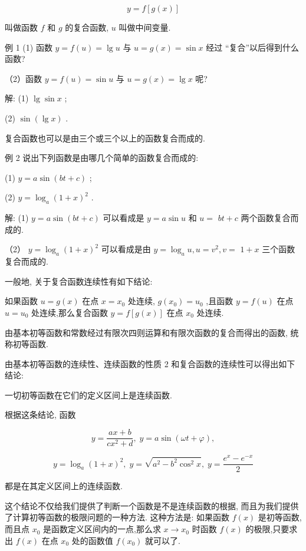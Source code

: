 \documentclass[10pt]{article}
\begin{document}
\[
y = f\left\lbrack {g\left( x\right) }\right\rbrack
\]

叫做函数 \(f\) 和 \(g\) 的复合函数, \(u\) 叫做中间变量.

例 1 (1) 函数 \(y = f\left( u\right) = \lg u\) 与 \(u = g\left( x\right) = \sin x\) 经过 “复合”以后得到什么函数?

（2）函数 \(y = f\left( u\right) = \sin u\) 与 \(u = g\left( x\right) = \lg x\) 呢?

解: (1) \(\lg \sin x\) ;

(2) \(\sin \left( {\lg x}\right)\) .

复合函数也可以是由三个或三个以上的函数复合而成的.

例 2 说出下列函数是由哪几个简单的函数复合而成的:

(1) \(y = a\sin \left( {{bt} + c}\right)\) ;

(2) \(y = {\log }_{a}{\left( 1 + x\right) }^{2}\) .

解: (1) \(y = a\sin \left( {{bt} + c}\right)\) 可以看成是 \(y = a\sin u\) 和 \(u =\) \({bt} + c\) 两个函数复合而成的.

（2） \(y = {\log }_{a}{\left( 1 + x\right) }^{2}\) 可以看成是由 \(y = {\log }_{a}u,u = {v}^{2},v =\) \(1 + x\) 三个函数复合而成的.

一般地, 关于复合函数连续性有如下结论:

如果函数 \(u = g\left( x\right)\) 在点 \(x = {x}_{0}\) 处连续, \(g\left( {x}_{0}\right) = {u}_{0}\) ,且函数 \(y = f\left( u\right)\) 在点 \(u = {u}_{0}\) 处连续,那么复合函数 \(y = f\left\lbrack {g\left( x\right) }\right\rbrack\) 在点 \({x}_{0}\) 处连续.

由基本初等函数和常数经过有限次四则运算和有限次函数的复合而得出的函数, 统称初等函数.

由基本初等函数的连续性、连续函数的性质 2 和复合函数的连续性可以得出如下结论:

一切初等函数在它们的定义区间上是连续函数.

根据这条结论, 函数

\[
y = \frac{{ax} + b}{c{x}^{2} + d},\;y = a\sin \left( {{\omega t} + \varphi }\right) ,
\]

\[
y = {\log }_{a}{\left( 1 + x\right) }^{2},\;y = \sqrt{{a}^{2} - {b}^{2}{\cos }^{2}x},\;y = \frac{{e}^{x} - {e}^{-x}}{2}
\]

都是在其定义区间上的连续函数.

这个结论不仅给我们提供了判断一个函数是不是连续函数的根据, 而且为我们提供了计算初等函数的极限问题的一种方法. 这种方法是: 如果函数 \(f\left( x\right)\) 是初等函数,而且点 \({x}_{0}\) 是函数定义区间内的一点,那么求 \(x \rightarrow {x}_{0}\) 时函数 \(f\left( x\right)\) 的极限,只要求出 \(f\left( x\right)\) 在点 \({x}_{0}\) 处的函数值 \(f\left( {x}_{0}\right)\) 就可以了.
\end{document}
